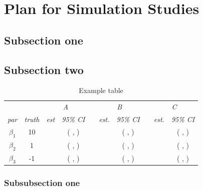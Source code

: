 \documentclass[12pt]{article}
\begin{document}
\newpage
\section{Plan for Simulation Studies}\label{sec:simulation}



\subsection{Subsection one}\label{sec:subsimulation1}


\subsection{Subsection two}\label{sec:subsimulation2}

\begin{table}[H]
\begin{center}
\caption{Example table}
\begin{tabular}{cccccccccc}
\hline
&  & \multicolumn{2}{c}{\emph{A}} && \multicolumn{2}{c}{\emph{B}} & &\multicolumn{2}{c}{\emph{C}} \\
\cline{3-4}\cline{6-7}\cline{9-10}
\emph{par}& \emph{truth}& \emph{est}    & \emph{95\% CI} & & \emph{est.}    & \emph{95\% CI}  && \emph{est.} & \emph{95\% CI}\\
\hline
$\beta_1$ & 10 &   &( , )& &  & ( , )& &  &( , )\\
$\beta_2$ & 1 & &( ,  ) & &  & ( , )& &  &( , )\\
$\beta_3$ & -1 &  &( ,  ) & &  & ( , )& & &( , )\\
\hline
\end{tabular}
\end{center}
\end{table}




\subsubsection{Subsubsection one}\label{sec:subsimulation2-1}
\end{document}
